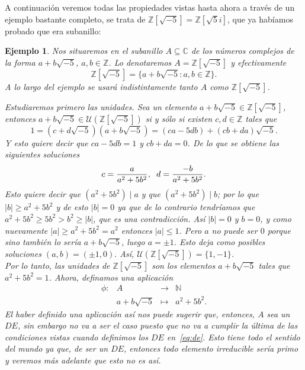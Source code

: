 \documentclass[12pt]{article}
\newtheorem{example}{Ejemplo}[theorem]
\begin{document}
A continuación veremos todas las propiedades vistas hasta ahora a través de un ejemplo bastante completo, se trata de $\mathbb{Z}[\sqrt{-5}] =\mathbb{Z}[\sqrt{5}i]$, que ya habíamos probado que era subanillo:

\begin{example} Nos situaremos en el subanillo $A \subseteq \mathbb{C}$ de los números complejos de la forma $a +b\sqrt{-5}$, $a,b \in \mathbb{Z}$. Lo denotaremos $A = \mathbb{Z}[\sqrt{-5}]$ y efectivamente $$\mathbb{Z}[\sqrt{-5}] = \lbrace a + b\sqrt{-5} : a,b \in \mathbb{Z} \rbrace.$$ A lo largo del ejemplo se usará indistintamente tanto $A$ como $\mathbb{Z}[\sqrt{-5}]$. 

Estudiaremos primero las unidades. Sea un elemento $a +b\sqrt{-5} \in \mathbb{Z}[\sqrt{-5}]$, entonces $a +b\sqrt{-5} \in \mathcal{U}(\mathbb{Z}[\sqrt{-5}])$ si y sólo si existen $c,d \in \mathbb{Z}$ tales que $$1 = (c + d\sqrt{-5})(a +b\sqrt{-5}) = (ca-5db) + (cb + da)\sqrt{-5}.$$ Y esto quiere decir que $ca-5db = 1$ y $cb + da = 0$. De lo que se obtiene las siguientes soluciones $$c = \dfrac{a}{a^{2}+5b^{2}}, \hspace{0.2cm} d = \dfrac{-b}{a^{2}+5b^{2}}.$$ Esto quiere decir que $(a^{2}+5b^{2}) \mid a$ y que $(a^{2} + 5b^{2}) \mid b$; por lo que $|b| \geq a^{2}+5b^{2}$ y de esto $|b| = 0$ ya que de lo contrario tendríamos que $a^{2} + 5b^{2} \geq 5b^{2} > b^{2} \geq |b|$, que es una contradicción. Así $|b| = 0$ y $b = 0$, y como nuevamente $|a| \geq a^{2} + 5b^{2} = a^{2}$ entonces $|a| \leq 1$. Pero $a$ no puede ser $0$ porque sino también lo sería $a + b\sqrt{-5}$, luego $a = \pm 1$. Esto deja como posibles soluciones $(a,b) = (\pm 1, 0).$ Así, $\mathcal{U} (\mathbb{Z}[\sqrt{-5}]) = \lbrace 1, -1 \rbrace$.\vspace{0.3cm}\\
 
Por lo tanto, las unidades de $\mathbb{Z}[\sqrt{-5}]$ son los elementos $a + b\sqrt{-5}$ tales que $a^{2} + 5b^{2} = 1$. Ahora, definamos una aplicación $$\begin{array}{rccl}
\phi \colon &A&\longrightarrow &\mathbb{N} \\
&a+b\sqrt{-5}& \longmapsto &a^{2}+ 5b^{2}.
\end{array}
$$ El haber definido una aplicación así nos puede sugerir que, entonces, $A$ sea un $DE$, sin embargo no va a ser el caso puesto que no va a cumplir la última de las condiciones vistas cuando definimos los $DE$ en~\ref{eq:de}. Esto tiene todo el sentido del mundo ya que, de ser un $DE$, entonces todo elemento irreducible sería primo y veremos más adelante que esto no es así.


\end{example}
\end{document}
